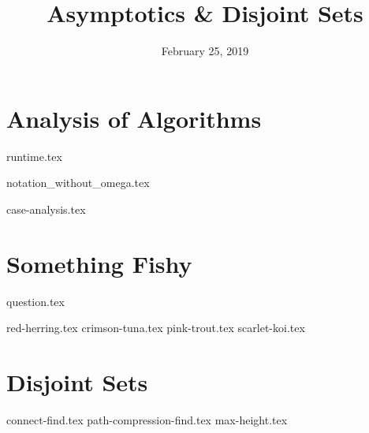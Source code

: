 \documentclass[11pt]{exam}
\title{Asymptotics \& Disjoint Sets}
\date{February 25, 2019}
\begin{document}
\maketitle

\section{Analysis of Algorithms}
{runtime.tex}
\begin{questions}

{notation_without_omega.tex}

{case-analysis.tex}
\end{questions}

\clearpage

\section{Something Fishy}
{question.tex}
\begin{questions}
{red-herring.tex}
{crimson-tuna.tex}
{pink-trout.tex}
{scarlet-koi.tex}
\end{questions}

\clearpage
\section{Disjoint Sets}
\begin{questions}
{connect-find.tex}
{path-compression-find.tex}
{max-height.tex}
\end{questions}

\clearpage
\end{document}
